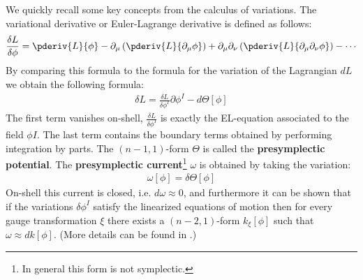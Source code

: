 	We quickly recall some key concepts from the calculus of variations. The variational derivative or Euler-Lagrange derivative is defined as follows:
	\begin{gather}
		\frac{\delta L}{\delta \phi} = \pderiv{L}{\phi} - \partial_\mu\left(\pderiv{L}{\partial_\mu\phi}\right) + \partial_\mu\partial_\nu\left(\pderiv{L}{\partial_\mu\partial_\nu\phi}\right) -\cdots
	\end{gather}
	By comparing this formula to the formula for the variation of the Lagrangian $dL$ we obtain the following formula:
	\begin{gather}
		\delta L = \frac{\delta L}{\delta \phi^I}\partial\phi^I - d\Theta[\phi]
	\end{gather}
	The first term vanishes on-shell, $\frac{\delta L}{\delta \phi^I}$ is exactly the EL-equation associated to the field $\phi I$. The last term contains the boundary terms obtained by performing integration by parts. The $(n-1, 1)$-form $\Theta$ is called the \textbf{presymplectic potential}. The \textbf{presymplectic current}\footnote{In general this form is not symplectic.} $\omega$ is obtained by taking the variation:
	\begin{gather}
		\omega[\phi] = \delta\Theta[\phi]
	\end{gather}
	On-shell this current is closed, i.e. $d\omega\approx0$, and furthermore it can be shown that if the variations $\delta\phi^I$ satisfy the linearized equations of motion then for every gauge transformation $\xi$ there exists a $(n-2, 1)$-form $k_\xi[\phi]$ such that $\omega\approx dk[\phi]$. (More details can be found in \cite{compere}.)
